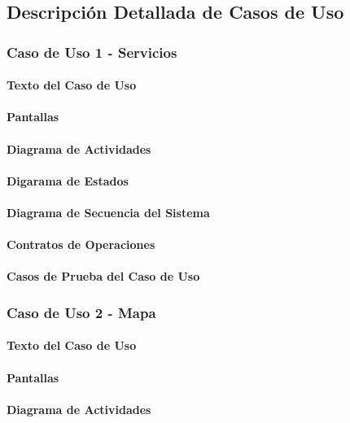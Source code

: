 \documentclass[12pt]{article}
\begin{document}
\subsection{Descripci\'on Detallada de Casos de Uso}

\subsubsection{Caso de Uso 1 - Servicios}
\paragraph{Texto del Caso de Uso}

\paragraph{Pantallas}
\paragraph{Diagrama de Actividades}
\paragraph{Digarama de Estados}
\paragraph{Diagrama de Secuencia del Sistema}
\paragraph{Contratos de Operaciones}
\paragraph{Casos de Prueba del Caso de Uso}

\subsubsection{Caso de Uso 2 - Mapa}
\paragraph{Texto del Caso de Uso}
\paragraph{Pantallas}
\paragraph{Diagrama de Actividades}
\end{document}
